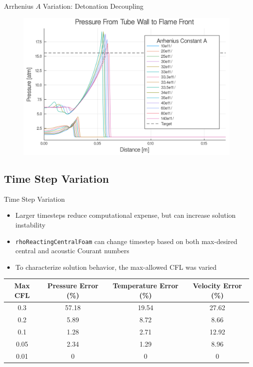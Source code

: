 \begin{frame}{Arrhenius $A$ Variation: Detonation Decoupling}
\begin{figure}
\centering
\includegraphics[width=0.8\linewidth]{../figs/Atest_refined/p_large.png}
\end{figure}
\end{frame}

\subsection{Time Step Variation}

\begin{frame}{Time Step Variation}
\begin{itemize}
\item Larger timesteps reduce computational expense, but can increase solution instability
\item \texttt{rhoReactingCentralFoam} can change timestep based on both max-desired central and acoustic Courant numbers
\item To characterize solution behavior, the max-allowed CFL was varied 
\end{itemize}
\begin{table}[]
\centering
\begin{tabular}{cccc}
Max CFL & Pressure Error (\%) & Temperature Error (\%) & Velocity Error (\%) \\ \hline
0.3 & 57.18 & 19.54 & 27.62 \\ 
0.2 & 5.89 & 8.72 & 8.66 \\
0.1 & 1.28 & 2.71 & 12.92 \\
0.05 & 2.34 & 1.29 & 8.96 \\
0.01 & 0 & 0 & 0 \\
\end{tabular}
\end{table}%
\end{frame}

